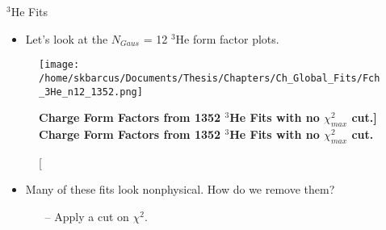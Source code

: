 \documentclass[10pt]{beamer}
\begin{document}
\begin{frame}[fragile]{$^3$He Fits}

	\begin{itemize}
		\item Let's look at the $N_{Gaus}$ = 12 $^3$He form factor plots.
	\end{itemize}
	
	\pause
	\begin{figure}[!ht]
	\begin{center}
	\texttt{[image: /home/skbarcus/Documents/Thesis/Chapters/Ch\_Global\_Fits/Fch\_3He\_n12\_1352.png]}
	\end{center}
	\caption[\bf{Charge Form Factors from 1352 $^3$He Fits with no $\chi^2_{max}$ cut.}]{
	{\bf{Charge Form Factors from 1352 $^3$He Fits with no $\chi^2_{max}$ cut.}} }
	\label{fig:3he_fch_no_cut}
	\end{figure}
	
	\pause
	\begin{itemize}
		\item \alert{Many of these fits look nonphysical}. How do we remove them?
		\begin{itemize}
			\item[--] Apply a cut on $\chi^2$.
		\end{itemize}
	\end{itemize}

\end{frame}
\end{document}
